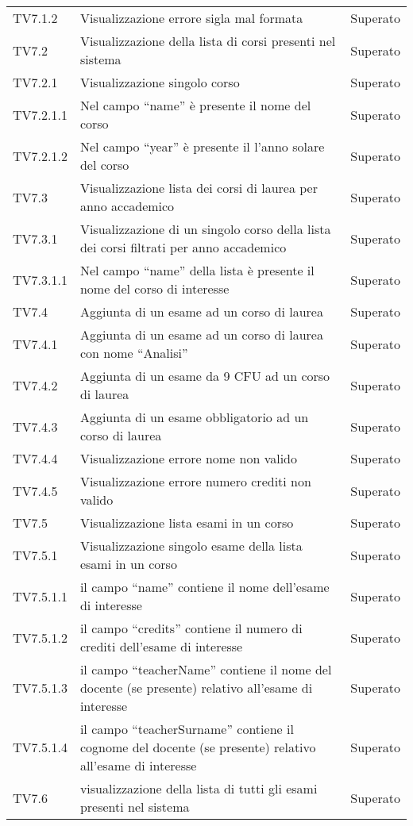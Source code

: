 \documentclass[PianoDiQualifica.tex]{subfiles}
\begin{document}
\begin{longtable}[H]{P{2cm}P{8.5cm}P{3cm}}
	TV7.1.2 & Visualizzazione errore sigla mal formata & Superato \\ 
	TV7.2 & Visualizzazione della lista di corsi presenti nel sistema & Superato \\ 
	TV7.2.1 & Visualizzazione singolo corso & Superato \\ 
	TV7.2.1.1 & Nel campo “name” è presente il nome del corso & Superato \\ 
	TV7.2.1.2 & Nel campo “year” è presente il l'anno solare del corso & Superato \\ 
	TV7.3 & Visualizzazione lista dei corsi di laurea per anno accademico & Superato \\ 
	TV7.3.1 & Visualizzazione di un singolo corso della lista dei corsi filtrati per anno accademico & Superato \\ 
	TV7.3.1.1 & Nel campo “name” della lista è presente il nome del corso di interesse & Superato \\ 
	TV7.4 & Aggiunta di un esame ad un corso di laurea & Superato \\ 
	TV7.4.1 & Aggiunta di un esame ad un corso di laurea con nome “Analisi” & Superato \\ 
	TV7.4.2 & Aggiunta di un esame da 9 CFU ad un corso di laurea & Superato \\ 
	TV7.4.3 & Aggiunta di un esame obbligatorio ad un corso di laurea & Superato \\ 
	TV7.4.4 & Visualizzazione errore nome non valido & Superato \\ 
	TV7.4.5 & Visualizzazione errore numero crediti non valido & Superato \\ 
	TV7.5 & Visualizzazione lista esami in un corso & Superato \\ 
	TV7.5.1 & Visualizzazione singolo esame della lista esami in un corso & Superato \\ 
	TV7.5.1.1 & il campo “name” contiene il nome dell'esame di interesse & Superato \\ 
	TV7.5.1.2 & il campo “credits” contiene il numero di crediti dell'esame di interesse & Superato \\ 
	TV7.5.1.3 & il campo “teacherName” contiene il nome del docente (se presente) relativo all'esame di interesse & Superato \\ 
	TV7.5.1.4 & il campo “teacherSurname” contiene il cognome del docente (se presente) relativo all'esame di interesse & Superato \\ 
	TV7.6 & visualizzazione della lista di tutti gli esami presenti nel sistema & Superato \\ 

\end{longtable}
\end{document}
